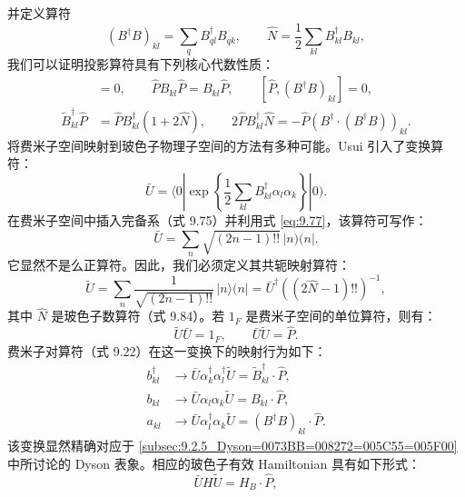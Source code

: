 并定义算符
\begin{equation}
(B^{\dagger}B)_{kl}=\sum_{q}B^{\dagger}_{ql}B_{qk},\qquad\hat{N}=\frac{1}{2}\sum_{kl}B^{\dagger}_{kl}B_{kl},\label{eq:9.84}
\end{equation}
我们可以证明投影算符具有下列核心代数性质：
\begin{align}
[\hat{P},\tilde{B}^{\dagger}_{kl}] & =0,\qquad\hat{P}B_{kl}\hat{P}=B_{kl}\hat{P},\qquad[\hat{P},(B^{\dagger}B)_{kl}]=0,\label{eq:9.85}\\
\tilde{B}^{\dagger}_{kl}\hat{P} & =\hat{P}B^{\dagger}_{kl}(1+2\hat{N}),\qquad2\hat{P}B^{\dagger}_{kl}\hat{N}=-\hat{P}\left(B^{\dagger}\cdot(B^{\dagger}B)\right)_{kl}.\label{eq:9.86}
\end{align}
将费米子空间映射到玻色子物理子空间的方法有多种可能。Usui \cite{Us60} 引入了变换算符：
\begin{equation}
\bar{U}=\langle0|\exp\left\{ \frac{1}{2}\sum_{kl}B^{\dagger}_{kl}\alpha_{l}\alpha_{k}\right\} |0).\label{eq:9.87}
\end{equation}
在费米子空间中插入完备系（式 9.75）并利用式 \ref{eq:9.77}，该算符可写作：
\begin{equation}
\bar{U}=\sum_{n}\sqrt{(2n-1)!!}\,|n)(n|.\label{eq:9.88}
\end{equation}
它显然不是么正算符。因此，我们必须定义其共轭映射算符：
\begin{equation}
\tilde{U}=\sum_{n}\frac{1}{\sqrt{(2n-1)!!}}\,|n\rangle(n|=\bar{U}^{\dagger}\left((2\hat{N}-1)!!\right)^{-1},\label{eq:9.89}
\end{equation}
其中 $\hat{N}$ 是玻色子数算符（式 9.84）。若 $1_{F}$ 是费米子空间的单位算符，则有：
\begin{equation}
\tilde{U}\bar{U}=1_{F},\qquad\bar{U}\tilde{U}=\hat{P}.\label{eq:9.90}
\end{equation}
费米子对算符（式 9.22）在这一变换下的映射行为如下：
\begin{align}
b^{\dagger}_{kl} & \to\bar{U}\alpha^{\dagger}_{k}\alpha^{\dagger}_{l}\tilde{U}=\tilde{B}^{\dagger}_{kl}\cdot\hat{P},\nonumber \\
b_{kl} & \to\bar{U}\alpha_{l}\alpha_{k}\tilde{U}=B_{kl}\cdot\hat{P},\label{eq:9.91}\\
a_{kl} & \to\bar{U}\alpha^{\dagger}_{l}\alpha_{k}\tilde{U}=(B^{\dagger}B)_{kl}\cdot\hat{P}.\nonumber 
\end{align}
该变换显然精确对应于 \ref{subsec:9.2.5_Dyson=0073BB=008272=005C55=005F00} 中所讨论的
Dyson 表象。相应的玻色子有效 Hamiltonian 具有如下形式：
\begin{equation}
\bar{U}H\tilde{U}=H_{B}\cdot\hat{P},\label{eq:9.92}
\end{equation}
